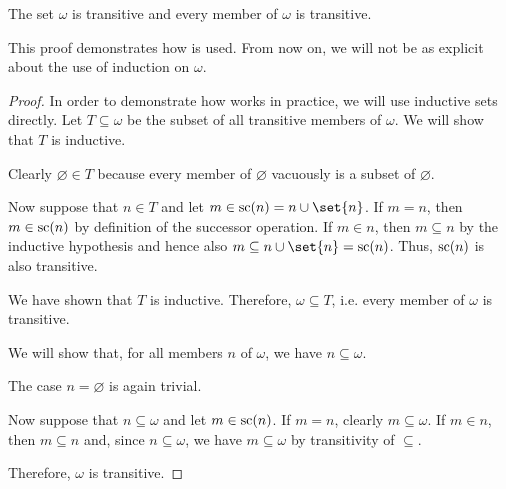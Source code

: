 \begin{proposition}\label{thm:omega_is_transitive}
  The set \( \omega \) is transitive and every member of \( \omega \) is transitive.
\end{proposition}
\begin{comments}
  \item This proof demonstrates how  is used. From now on, we will not be as explicit about the use of induction on \( \omega \).
\end{comments}
\begin{proof}
   In order to demonstrate how  works in practice, we will use inductive sets directly. Let \( T \subseteq \omega \) be the subset of all transitive members of \( \omega \). We will show that \( T \) is inductive.

  Clearly \( \varnothing \in T \)  because every member of \( \varnothing \) vacuously is a subset of \( \varnothing \).

  Now suppose that \( n \in T \) and let \( m \in \op{sc}(n) = n \cup \set{ n } \). If \( m = n \), then \( m \in \op{sc}(n) \) by definition of the successor operation. If \( m \in n \), then \( m \subseteq n \) by the inductive hypothesis and hence also \( m \subseteq n \cup \set{ n } = \op{sc}(n) \). Thus, \( \op{sc}(n) \) is also transitive.

  We have shown that \( T \) is inductive. Therefore, \( \omega \subseteq T \), i.e. every member of \( \omega \) is transitive.

   We will show that, for all members \( n \) of \( \omega \), we have \( n \subseteq \omega \).

  The case \( n = \varnothing \) is again trivial.

  Now suppose that \( n \subseteq \omega \) and let \( m \in \op{sc}(n) \). If \( m = n \), clearly \( m \subseteq \omega \). If \( m \in n \), then \( m \subseteq n \) and, since \( n \subseteq \omega \), we have \( m \subseteq \omega \) by transitivity of \( \subseteq \).

  Therefore, \( \omega \) is transitive.
\end{proof}

